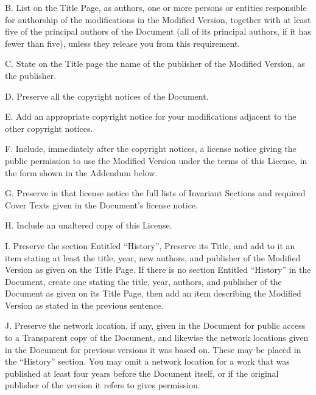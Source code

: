{\tiny{}B. List on the Title Page, as authors, one or more persons
or entities responsible for authorship of the modifications in the
Modified Version, together with at least five of the principal authors
of the Document (all of its principal authors, if it has fewer than
five), unless they release you from this requirement.}{\tiny\par}

{\tiny{}C. State on the Title page the name of the publisher of the
Modified Version, as the publisher.}{\tiny\par}

{\tiny{}D. Preserve all the copyright notices of the Document.}{\tiny\par}

{\tiny{}E. Add an appropriate copyright notice for your modifications
adjacent to the other copyright notices.}{\tiny\par}

{\tiny{}F. Include, immediately after the copyright notices, a license
notice giving the public permission to use the Modified Version under
the terms of this License, in the form shown in the Addendum below.}{\tiny\par}

{\tiny{}G. Preserve in that license notice the full lists of Invariant
Sections and required Cover Texts given in the Document's license
notice.}{\tiny\par}

{\tiny{}H. Include an unaltered copy of this License.}{\tiny\par}

{\tiny{}I. Preserve the section Entitled ``History'', Preserve its
Title, and add to it an item stating at least the title, year, new
authors, and publisher of the Modified Version as given on the Title
Page. If there is no section Entitled “History” in the Document, create
one stating the title, year, authors, and publisher of the Document
as given on its Title Page, then add an item describing the Modified
Version as stated in the previous sentence.}{\tiny\par}

{\tiny{}J. Preserve the network location, if any, given in the Document
for public access to a Transparent copy of the Document, and likewise
the network locations given in the Document for previous versions
it was based on. These may be placed in the ``History'' section.
You may omit a network location for a work that was published at least
four years before the Document itself, or if the original publisher
of the version it refers to gives permission.}{\tiny\par}


